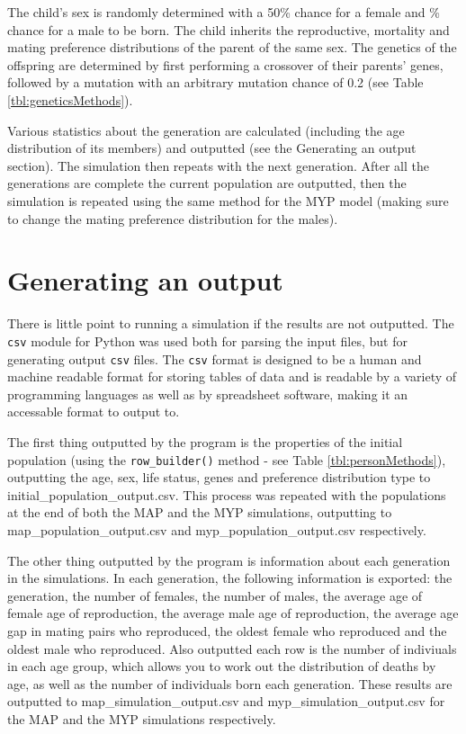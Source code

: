 \documentclass[authoryearcitations]{UoYCSproject}
\begin{document}
The child's sex is randomly determined with a 50\% chance for a female and \% chance for a male to be born. The child inherits the reproductive, mortality and mating preference distributions of the parent of the same sex. The genetics of the offspring are determined by first performing a crossover of their parents' genes, followed by a mutation with an arbitrary mutation chance of 0.2 (see Table \ref{tbl:geneticsMethods}).

Various statistics about the generation are calculated (including the age distribution of its members) and outputted (see the Generating an output section). The simulation then repeats with the next generation. After all the generations are complete the current population are outputted, then the simulation is repeated using the same method for the MYP model (making sure to change the mating preference distribution for the males).

\newpage
\section{Generating an output}
There is little point to running a simulation if the results are not outputted. The \texttt{csv} module for Python was used both for parsing the input files, but for generating output \texttt{csv} files. The \texttt{csv} format is designed to be a human and machine readable format for storing tables of data and is readable by a variety of programming languages as well as by spreadsheet software, making it an accessable format to output to.

The first thing outputted by the program is the properties of the initial population (using the \texttt{row\_builder()} method - see Table \ref{tbl:personMethods}), outputting the age, sex, life status, genes and preference distribution type to initial\_population\_output.csv. This process was repeated with the populations at the end of both the MAP and the MYP simulations, outputting to map\_population\_output.csv and myp\_population\_output.csv respectively.

The other thing outputted by the program is information about each generation in the simulations. In each generation, the following information is exported: the generation, the number of females, the number of males, the average age of female age of reproduction, the average male age of reproduction, the average age gap in mating pairs who reproduced, the oldest female who reproduced and the oldest male who reproduced. Also outputted each row is the number of indiviuals in each age group, which allows you to work out the distribution of deaths by age, as well as the number of individuals born each generation. These results are outputted to map\_simulation\_output.csv and myp\_simulation\_output.csv for the MAP and the MYP simulations respectively.
\end{document}

